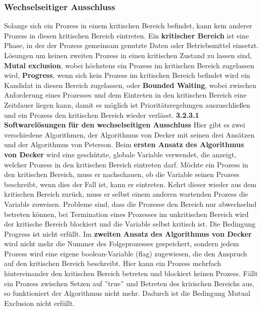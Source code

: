 \documentclass{article}
\begin{document}
\subsubsection{Wechselseitiger Ausschluss}
    Solange sich ein Prozess in einem kritischen Bereich befindet, kann kein anderer Prozess in diesen kritischen Bereich eintreten. Ein \textbf{kritischer Bereich} ist eine Phase, in der der Prozess gemeinsam genutzte Daten oder Betriebsmittel einsetzt.\newline
    Lösungen um keinen zweiten Prozess in einen kritischen Zustand zu lassen sind, \textbf{Mutal exclusion}, wobei höchstens ein Prozess im kritischen Bereich zugelassen wird, \textbf{Progress}, wenn sich kein Prozess im kritischen Bereich befindet wird ein Kandidat in diesen Bereich zugelassen, oder \textbf{Bounded Waiting}, wobei zwischen Anforderung eines Prozesses und dem Eintreten in den kritischen Bereich eine Zeitdauer liegen kann, damit es möglich ist Prioritätsregelungen auszuschließen und ein Prozess den kritischen Bereich wieder verlässt.\newline
    \textbf{3.2.3.1 Softwarelösungen für den wechselseitigen Ausschluss}\newline
    Hier gibt es zwei verschiedene Algorithmen, der Algorithmus von Decker mit seinen drei Ansätzen und der Algorithmus von Peterson.\newline
    Beim \textbf{ersten Ansatz des Algorithmus von Decker} wird eine geschützte, globale Variable verwendet, die anzeigt, welcher Prozess in den kritischen Bereich eintreten darf. Möchte ein Prozess in den kritischen Bereich, muss er nachschauen, ob die Variable seinen Prozess beschreibt, wenn dies der Fall ist, kann er eintreten. Kehrt dieser wieder aus dem kritischen Bereich zurück, muss er selbst einem anderen wartenden Prozess die Variable zuweisen. Probleme sind, dass die Prozesse den Bereich nur abwechselnd betreten können, bei Termination eines Prozesses im unkritischen Bereich wird der kritische Bereich blockiert und die Variable selbst kritisch ist. Die Bedingung Progress ist nicht erfüllt.\newline
    Im \textbf{zweiten Ansatz des Algorithmus von Decker} wird nicht mehr die Nummer des Folgeprozesses gespeichert, sondern jedem Prozess wird eine eigene boolean-Variable (flag) zugewiesen, die den Anspruch auf den kritischen Bereich beschreibt. Hier kann ein Prozess mehrfach hintereinander den kritischen Bereich betreten und blockiert keinen Prozess. Fällt ein Prozess zwischen Setzen auf ''true'' und Betreten des kririschen Bereichs aus, so funktioniert der Algorithmus nicht mehr. Dadurch ist die Bedingung Mutual Exclusion nicht erfüllt.\newline
\end{document}
